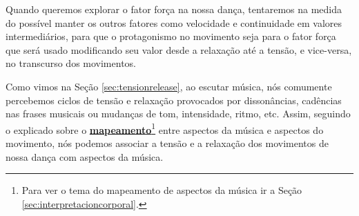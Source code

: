Quando queremos explorar o fator força na nossa dança, tentaremos na medida do possível 
manter os outros fatores como velocidade e continuidade em valores intermediários,
para que o protagonismo no movimento seja para o fator força 
que será usado modificando seu valor desde a relaxação até a tensão, e vice-versa, no transcurso dos movimentos. 

Como vimos na Seção \ref{sec:tensionrelease}, 
ao escutar música, nós comumente percebemos ciclos de tensão e relaxação 
provocados por dissonâncias, cadências nas frases musicais ou mudanças de
tom, intensidade, ritmo, etc.
Assim, 
seguindo o explicado sobre o \hyperref[sec:interpretacioncorporal]{\textbf{mapeamento}}\footnote{Para
ver o tema do mapeamento de aspectos da música ir a Seção \ref{sec:interpretacioncorporal}.} 
entre aspectos da música e aspectos do movimento,
nós podemos associar a tensão e a relaxação dos movimentos de nossa dança com aspectos da música.



